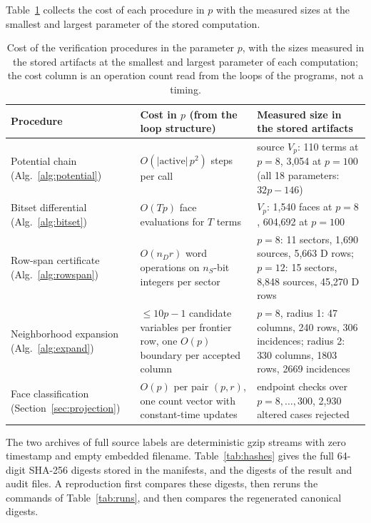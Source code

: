 \documentclass[11pt]{article}
\theoremstyle{definition}
\theoremstyle{remark}
\begin{document}
Table~\ref{tab:cost} collects the cost of each procedure in $p$ with the measured
sizes at the smallest and largest parameter of the stored computation.

\begin{table}[t]
\centering\scriptsize
\begin{tabular}{>{\raggedright\arraybackslash}p{}>{\raggedright\arraybackslash}p{}>{\raggedright\arraybackslash}p{}}
\toprule
Procedure & Cost in $p$ (from the loop structure) & Measured size in the stored artifacts\\
\midrule
Potential chain (Alg.~\ref{alg:potential}) & $O(|\mathrm{active}|\,p^2)$ steps per call & source $V_p$: 110 terms at $p=8$, 3,054 at $p=100$ (all 18 parameters: $32p-146$)\\[2pt]
Bitset differential (Alg.~\ref{alg:bitset}) & $O(Tp)$ face evaluations for $T$ terms & $V_p$: 1,540 faces at $p=8$, 604,692 at $p=100$\\[2pt]
Row-span certificate (Alg.~\ref{alg:rowspan}) & $O(n_D r)$ word operations on $n_S$-bit integers per sector & $p=8$: 11 sectors, 1,690 sources, 5,663 D rows; $p=12$: 15 sectors, 8,848 sources, 45,270 D rows\\[2pt]
Neighborhood expansion (Alg.~\ref{alg:expand}) & $\le 10p-1$ candidate variables per frontier row, one $O(p)$ boundary per accepted column & $p=8$, radius 1: 47 columns, 240 rows, 306 incidences; radius 2: 330 columns, 1803 rows, 2669 incidences\\[2pt]
Face classification (Section~\ref{sec:projection}) & $O(p)$ per pair $(p,r)$, one count vector with constant-time updates & 586 endpoint checks over $p=8,\ldots,300$, 2,930 altered cases rejected\\
\bottomrule
\end{tabular}
\caption{Cost of the verification procedures in the parameter $p$, with the sizes measured in the stored artifacts at the smallest and
largest parameter of each computation; the cost column is an operation count read from the loops of the programs, not a timing.}
\label{tab:cost}
\end{table}

The two archives of full source labels are deterministic gzip streams with zero
timestamp and empty embedded filename. Table~\ref{tab:hashes} gives the full
64-digit SHA-256 digests stored in the manifests, and the digests of the result
and audit files. A reproduction first compares these digests, then reruns the
commands of Table~\ref{tab:runs}, and then compares the regenerated canonical
digests.
\end{document}
